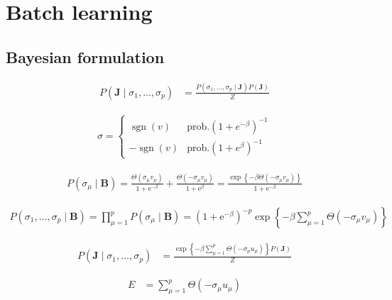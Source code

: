 \documentclass{article}
\begin{document}
\clearpage

\section{Batch learning}

\subsection{Bayesian formulation}

\begin{align*}
P\left(\boldsymbol{J} \mid \sigma_{1}, \ldots, \sigma_{p}\right) &= \frac{P\left(\sigma_{1}, \ldots, \sigma_{p} \mid \boldsymbol{J}\right) P(\boldsymbol{J})}{Z} \tag{8.8}
\end{align*}

\begin{align*}
\sigma = \begin{cases}
\operatorname{sgn}(v) & \text{prob.} \left(1 + e^{-\beta}\right)^{-1} \\
-\operatorname{sgn}(v) & \text{prob.} \left(1 + e^{\beta}\right)^{-1}
\end{cases} \tag{8.9}
\end{align*}

\begin{align*}
P\left(\sigma_{\mu} \mid \boldsymbol{B}\right)=\frac{\Theta\left(\sigma_{\mu} v_{\mu}\right)}{1+\mathrm{e}^{-\beta}}+\frac{\Theta\left(-\sigma_{\mu} v_{\mu}\right)}{1+\mathrm{e}^{\beta}}=\frac{\exp \left\{-\beta \Theta\left(-\sigma_{\mu} v_{\mu}\right)\right\}}{1+\mathrm{e}^{-\beta}}
\tag{8.10}
\end{align*}

\begin{align*}
P\left(\sigma_{1}, \ldots, \sigma_{p} \mid \boldsymbol{B}\right)=\prod_{\mu=1}^{p} P\left(\sigma_{\mu} \mid \boldsymbol{B}\right)=\left(1+\mathrm{e}^{-\beta}\right)^{-p} \exp \left\{-\beta \sum_{\mu=1}^{p} \Theta\left(-\sigma_{\mu} v_{\mu}\right)\right\}
\tag{8.11}
\end{align*}

\begin{align*}
P\left(\boldsymbol{J} \mid \sigma_{1}, \ldots, \sigma_{p}\right) &= \frac{\exp \left\{-\beta \sum_{\mu=1}^{p} \Theta\left(-\sigma_{\mu} u_{\mu}\right)\right\} P(\boldsymbol{J})}{Z} \tag{8.12}
\end{align*}

\begin{align*}
E &= \sum_{\mu=1}^{p} \Theta\left(-\sigma_{\mu} u_{\mu}\right) \tag{8.13}
\end{align*}
\end{document}
